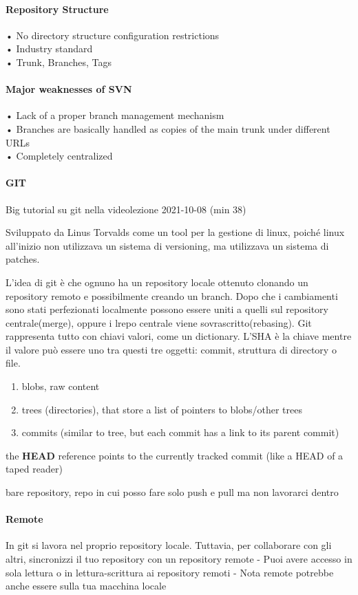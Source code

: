\documentclass[10pt,a4paper]{book}
\begin{document}
\paragraph{Repository Structure}
• No directory structure configuration restrictions\\
• Industry standard\\
• Trunk, Branches, Tags\\

\paragraph{Major weaknesses of SVN}
• Lack of a proper branch management mechanism\\
• Branches are basically handled as copies of the main trunk under different URLs\\
• Completely centralized\\

\paragraph{GIT}
\begin{LARGE}
Big tutorial su git nella videolezione 2021-10-08 (min 38)
\end{LARGE}


Sviluppato da Linus Torvalds come un tool per la gestione di linux, poiché linux all'inizio non utilizzava un sistema di versioning, ma utilizzava un sistema di patches.

L'idea di git è che ognuno ha un repository locale ottenuto clonando un repository remoto e possibilmente creando un branch.
Dopo che i cambiamenti sono stati perfezionati localmente possono essere uniti a quelli sul repository centrale(merge), oppure i lrepo centrale viene sovrascritto(rebasing).
\medskip 
Git rappresenta tutto con chiavi valori, come un dictionary. L'SHA è la chiave mentre il valore può essere uno tra questi tre oggetti: commit, struttura di directory o file.

\begin{enumerate}
\item blobs, raw content
\item trees (directories), that store a list of pointers to blobs/other trees
\item commits (similar to tree, but each commit has a link to its parent commit)
\end{enumerate}


the \textbf{HEAD} reference points to the currently tracked commit (like a HEAD of a taped reader)

bare repository, repo in cui posso fare solo push e pull ma non lavorarci dentro

\paragraph{Remote}
In git si lavora nel proprio repository locale. Tuttavia, per collaborare con gli altri, sincronizzi il tuo repository con un repository remote
- Puoi avere accesso in sola lettura o in lettura-scrittura ai repository remoti
- Nota remote potrebbe anche essere sulla tua macchina locale
\end{document}
